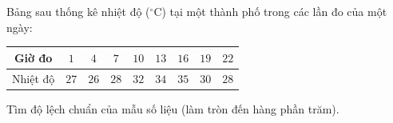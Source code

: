 \begin{ex}
Bảng sau thống kê nhiệt độ ($^\circ$C) tại một thành phố trong các lần đo của một ngày:
\begin{center}
\begin{tabular}{|c|c|c|c|c|c|c|c|c|}\hline
Giờ đo & $1$ & $4$ & $7$ & $10$ & $13$ & $16$ & $19$ & $22$\\\hline
Nhiệt độ & $27$ & $26$ & $28$ & $32$ & $34$ & $35$ & $30$ & $28$\\\hline
\end{tabular}
\end{center}
Tìm độ lệch chuẩn của mẫu số liệu (làm tròn đến hàng phần trăm).
\end{ex}
